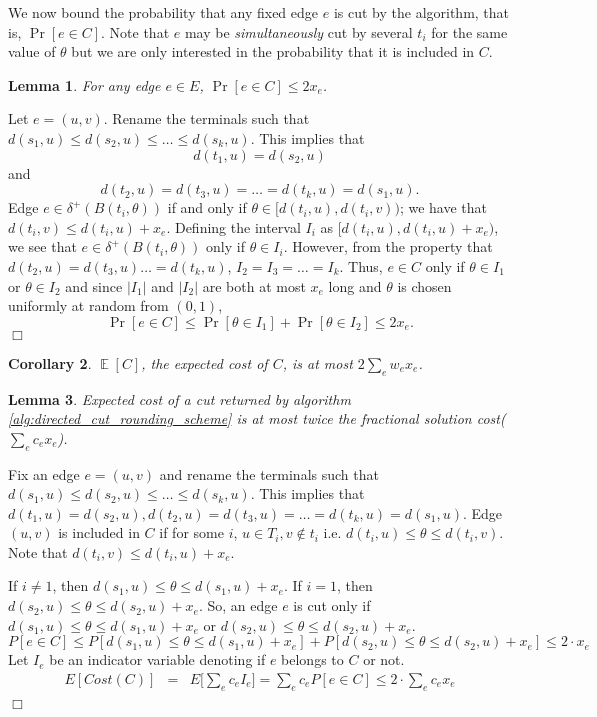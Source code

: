 \documentclass[11pt]{article}
\newtheorem{lemma}{Lemma}[section]
\newtheorem{corollary}[lemma]{Corollary}
\DeclareMathOperator*{\Ex}{\mathbb{E}}
\renewenvironment{proof}{\vspace{-0.1in}\noindent{\bf Proof:}}{\hspace*{\fill}$\Box$\par}
\begin{document}
We now bound the probability that any fixed edge $e$ is cut by the
algorithm, that is, $\Pr[e \in C]$.  Note that $e$ may be {\em
  simultaneously} cut by several $t_i$ for the same value of $\theta$
but we are only interested in the probability that it is included in
$C$.

\begin{lemma}
  \label{lem:prob-e-cut}
  For any edge $e \in E$, $\Pr[e \in C] \le 2 x_e$.
\end{lemma}
\begin{proof}
  Let $e=(u,v)$. Rename the terminals such that $d(s_1,u) \leq
  d(s_2,u) \leq \dots \leq d(s_k,u)$. This implies that 
  $$d(t_1,u) = d(s_2,u)$$
  and 
  $$d(t_2,u) = d(t_3,u) = \ldots = d(t_k,u) = d(s_1,u).$$
  Edge $e \in \delta^+(B(t_i,\theta))$ if and only if $\theta \in [d(t_i,u),
  d(t_i,v))$; we have that $d(t_i,v) \le d(t_i,u) + x_e$. 
  Defining the interval $I_i$ as $[d(t_i,u),d(t_i,u)+x_e)$, we see
  that $e \in \delta^+(B(t_i,\theta))$ only if $\theta \in I_i$. 
  However, from the property that $d(t_2,u) = d(t_3,u) \ldots = d(t_k,u)$,
  $I_2 = I_3 = \ldots = I_k$. Thus, 
  $e \in C$ only if $\theta \in I_1$ or $\theta \in I_2$ and
  since $|I_1|$ and $|I_2|$ are both at most $x_e$ long and $\theta$
  is chosen uniformly at random from $(0,1)$,
  $$\Pr[e \in C] \le \Pr[\theta \in I_1] + \Pr[\theta \in I_2] \le 2 x_e.$$
\end{proof}

\begin{corollary}
  $\Ex[C]$, the expected cost of $C$, is at most $2 \sum_e w_e x_e$.
\end{corollary}




\iffalse
\begin{lemma}
Expected cost of a cut returned by algorithm \ref{alg:directed_cut_rounding_scheme} is at most twice the fractional solution cost\Big($\sum_e c_e x_e$\Big).
\end{lemma}
\begin{proof}
Fix an edge $e=(u,v)$ and rename the terminals such that $d(s_1,u) \leq d(s_2,u) \leq \dots \leq d(s_k,u)$. This implies that $d(t_1,u) = d(s_2,u), d(t_2,u) = d(t_3,u) = \dots = d(t_k,u) = d(s_1,u)$. Edge $(u,v)$ is included in $C$ if for some $i$, $u\in T_i, v\not \in t_i$ i.e. $d(t_i,u) \leq \theta \leq d(t_i,v)$. Note that $d(t_i,v) \leq d(t_i,u) + x_e$.

 If $i \neq 1$, then $d(s_1,u) \leq \theta \leq d(s_1,u) + x_e$. If $i = 1$, then $d(s_2,u) \leq \theta \leq d(s_2,u) + x_e$. So, an edge $e$ is cut only if $d(s_1,u) \leq \theta \leq d(s_1,u) + x_e$ or $d(s_2,u) \leq \theta \leq d(s_2,u) + x_e$. 
\begin{equation*}
	P[e \in C] \leq P[d(s_1,u) \leq \theta \leq d(s_1,u) + x_e] + P[d(s_2,u) \leq  \theta \leq d(s_2,u) + x_e] \leq 2\cdot x_e
\end{equation*}
Let $I_e$ be an indicator variable denoting if $e$ belongs to $C$ or not. 
\begin{eqnarray*}
E[Cost(C)] & = & E\Big[ \sum_e c_e I_e \Big]  =  \sum_e c_e P[e \in C] \leq  2 \cdot \sum_e c_e x_e \\
\end{eqnarray*}
\end{proof}
\end{document}
